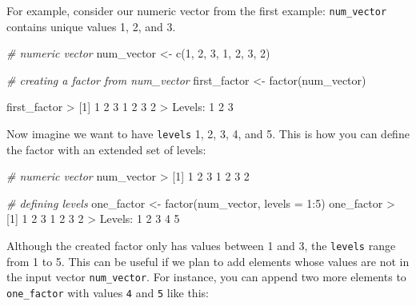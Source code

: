 \documentclass[
]{book}
\newenvironment{Shaded}{\begin{snugshade}}{\end{snugshade}}
\newcommand{\AttributeTok}[1]{\textcolor[rgb]{0.77,0.63,0.00}{#1}}
\newcommand{\CommentTok}[1]{\textcolor[rgb]{0.56,0.35,0.01}{\textit{#1}}}
\newcommand{\DecValTok}[1]{\textcolor[rgb]{0.00,0.00,0.81}{#1}}
\newcommand{\FunctionTok}[1]{\textcolor[rgb]{0.00,0.00,0.00}{#1}}
\newcommand{\NormalTok}[1]{#1}
\newcommand{\OtherTok}[1]{\textcolor[rgb]{0.56,0.35,0.01}{#1}}
\newcommand{\SpecialCharTok}[1]{\textcolor[rgb]{0.00,0.00,0.00}{#1}}
\begin{document}
For example, consider our numeric vector from the first example: \texttt{num\_vector}
contains unique values 1, 2, and 3.

\begin{Shaded}
\begin{Highlighting}[]
\CommentTok{\# numeric vector}
\NormalTok{num\_vector }\OtherTok{\textless{}{-}} \FunctionTok{c}\NormalTok{(}\DecValTok{1}\NormalTok{, }\DecValTok{2}\NormalTok{, }\DecValTok{3}\NormalTok{, }\DecValTok{1}\NormalTok{, }\DecValTok{2}\NormalTok{, }\DecValTok{3}\NormalTok{, }\DecValTok{2}\NormalTok{)}

\CommentTok{\# creating a factor from num\_vector}
\NormalTok{first\_factor }\OtherTok{\textless{}{-}} \FunctionTok{factor}\NormalTok{(num\_vector)}

\NormalTok{first\_factor}
\SpecialCharTok{\textgreater{}}\NormalTok{ [}\DecValTok{1}\NormalTok{] }\DecValTok{1} \DecValTok{2} \DecValTok{3} \DecValTok{1} \DecValTok{2} \DecValTok{3} \DecValTok{2}
\SpecialCharTok{\textgreater{}}\NormalTok{ Levels}\SpecialCharTok{:} \DecValTok{1} \DecValTok{2} \DecValTok{3}
\end{Highlighting}
\end{Shaded}

Now imagine we want to have \texttt{levels} 1, 2, 3, 4, and 5. This is how you can
define the factor with an extended set of levels:

\begin{Shaded}
\begin{Highlighting}[]
\CommentTok{\# numeric vector}
\NormalTok{num\_vector}
\SpecialCharTok{\textgreater{}}\NormalTok{ [}\DecValTok{1}\NormalTok{] }\DecValTok{1} \DecValTok{2} \DecValTok{3} \DecValTok{1} \DecValTok{2} \DecValTok{3} \DecValTok{2}

\CommentTok{\# defining levels}
\NormalTok{one\_factor }\OtherTok{\textless{}{-}} \FunctionTok{factor}\NormalTok{(num\_vector, }\AttributeTok{levels =} \DecValTok{1}\SpecialCharTok{:}\DecValTok{5}\NormalTok{)}
\NormalTok{one\_factor}
\SpecialCharTok{\textgreater{}}\NormalTok{ [}\DecValTok{1}\NormalTok{] }\DecValTok{1} \DecValTok{2} \DecValTok{3} \DecValTok{1} \DecValTok{2} \DecValTok{3} \DecValTok{2}
\SpecialCharTok{\textgreater{}}\NormalTok{ Levels}\SpecialCharTok{:} \DecValTok{1} \DecValTok{2} \DecValTok{3} \DecValTok{4} \DecValTok{5}
\end{Highlighting}
\end{Shaded}

Although the created factor only has values between 1 and 3, the \texttt{levels} range
from 1 to 5. This can be useful if we plan to add elements whose values are not
in the input vector \texttt{num\_vector}. For instance, you can append two more elements
to \texttt{one\_factor} with values \texttt{4} and \texttt{5} like this:
\end{document}
